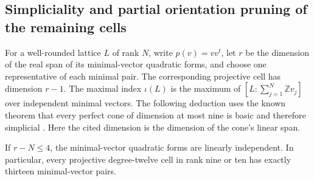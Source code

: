 
\subsection{Simpliciality and partial orientation pruning of the remaining cells}
\label{subsec:k12-orientation}

For a well-rounded lattice $L$ of rank $N$, write $p(v)=vv^t$, let
$r$ be the dimension of the real span of its minimal-vector quadratic
forms, and choose one representative of each minimal pair.
The corresponding projective cell has dimension $r-1$.
The maximal index $\iota(L)$ is the maximum of
$[L:\sum_{j=1}^N\mathbb Z v_j]$ over independent minimal vectors.
The following deduction uses the known theorem that every perfect cone
of dimension at most nine is basic and therefore simplicial
\cite[Theorem~1.1(i), pp.~644--646]{DutourHulekSchurmann2015}.
Here the cited dimension is the dimension of the cone's linear span.

\begin{proposition}
\label{prop:k12-low-excess-simplicial}
If $r-N\leq4$, the minimal-vector quadratic forms are linearly
independent. In particular, every projective degree-twelve cell in
rank nine or ten has exactly thirteen minimal-vector pairs.
\end{proposition}

